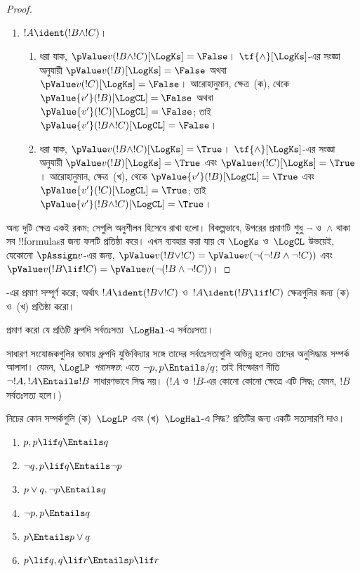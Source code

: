 \documentclass[../../../include/open-logic-section]{subfiles}
\begin{document}
\begin{proof}
\begin{enumerate}
    \item $!A \ident (!B \land !C)$।
    \begin{enumerate}
      \item ধরা যাক, $\pValue v(!B \land !C)[\LogKs] = \False$।
      $\tf{\land}[\LogKs]$-এর সংজ্ঞা অনুযায়ী
      $\pValue v(!B)[\LogKs] = \False$ অথবা
      $\pValue v(!C)[\LogKs] = \False$। আরোহানুমান, ক্ষেত্র~(ক), থেকে
      $\pValue {v'}(!B)[\LogCL] = \False$ অথবা
      $\pValue {v'}(!C)[\LogCL] = \False$; তাই
      $\pValue {v'}(!B \land !C)[\LogCL] = \False$।
      \item ধরা যাক, $\pValue v(!B \land !C)[\LogKs] = \True$।
      $\tf{\land}[\LogKs]$-এর সংজ্ঞা অনুযায়ী
      $\pValue v(!B)[\LogKs] = \True$ এবং
      $\pValue v(!C)[\LogKs] = \True$। আরোহানুমান, ক্ষেত্র~(খ), থেকে
      $\pValue {v'}(!B)[\LogCL] = \True$ এবং
      $\pValue {v'}(!C)[\LogCL] = \True$; তাই
      $\pValue {v'}(!B \land !C)[\LogCL] = \True$।
    \end{enumerate}
  \end{enumerate}

  অন্য দুটি ক্ষেত্র একই রকম; সেগুলি অনুশীলন হিসেবে রাখা হলো। বিকল্পভাবে,
  উপরের প্রমাণটি শুধু $\lnot$ ও~$\land$ থাকা সব !!{formula}sর জন্য ফলটি
  প্রতিষ্ঠা করে। এখন ব্যবহার করা যায় যে $\LogKs$ ও~$\LogCL$ উভয়েই,
  যেকোনো $\pAssign v$-এর জন্য,
  $\pValue v(!B \lor !C) = \pValue v(\lnot(\lnot!B \land \lnot !C))$
  এবং
  $\pValue v(!B \lif !C) = \pValue v(\lnot(!B \land \lnot !C))$।
\end{proof}

\begin{prob}
  -এর প্রমাণ সম্পূর্ণ করো; অর্থাৎ
  $!A \ident (!B \lor !C)$ ও~$!A \ident (!B \lif !C)$ ক্ষেত্রগুলির
  জন্য (ক) ও~(খ) প্রতিষ্ঠা করো।
\end{prob}

\begin{prob}
প্রমাণ করো যে প্রতিটি ধ্রুপদি সর্বতঃসত্য~$\LogHal$-এ সর্বতঃসত্য।
\end{prob}

সাধারণ সংযোজকগুলির ভাষায় ধ্রুপদি যুক্তিবিদ্যার সঙ্গে তাদের সর্বতঃসত্যগুলি
অভিন্ন হলেও তাদের
অনুসিদ্ধান্ত সম্পর্ক আলাদা। যেমন, $\LogLP$ \emph{পরাসঙ্গত}: এতে
$\lnot p, p \Entails/ q$; তাই বিস্ফোরণ নীতি
$\lnot !A, !A \Entails !B$ সাধারণভাবে সিদ্ধ নয়। ($!A$ ও~$!B$-এর কোনো
কোনো ক্ষেত্রে এটি সিদ্ধ; যেমন, $!B$ সর্বতঃসত্য হলে।)

\begin{prob}
  নিচের কোন সম্পর্কগুলি (ক)~$\LogLP$ এবং (খ)~$\LogHal$-এ সিদ্ধ?
  প্রতিটির জন্য একটি সত্যসারণি দাও।
  \begin{enumerate}
    \item $p, p \lif q \Entails q$
    \item $\lnot q, p \lif q \Entails \lnot p$
    \item $p \lor q, \lnot p \Entails q$
    \item $\lnot p, p \Entails q$
    \item $p \Entails p \lor q$
    \item $p \lif q, q\lif r \Entails p \lif r$
  \end{enumerate}
\end{prob}
\end{document}
